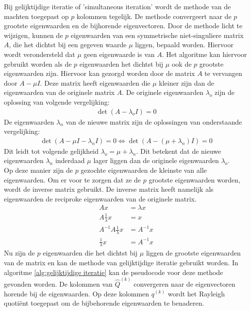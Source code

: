 \documentclass[a4paper, 12pt, titlepage, fleqn]{article}
\begin{document}
Bij gelijktijdige iteratie of 'simultaneous iteration' wordt de methode van de machten toegepast op $p$ kolommen tegelijk. De methode convergeert naar de $p$ grootste eigenwaarden en de bijhorende eigenvectoren. Door de methode licht te wijzigen, kunnen de $p$ eigenwaarden van een symmetrische niet-singuliere matrix $A$, die het dichtst bij een gegeven waarde $\mu$ liggen, bepaald worden. Hiervoor wordt verondersteld dat $\mu$ geen eigenwaarde is van $A$. Het algoritme kan hiervoor gebruikt worden als de $p$ eigenwaarden het dichtst bij $\mu$ ook de $p$ grootste eigenwaarden zijn. Hiervoor kan gezorgd worden door de matrix $A$ te vervangen door $A - \mu I$. Deze matrix heeft eigenwaarden die $\mu$ kleiner zijn dan de eigenwaarden van de originele matrix $A$. De originele eigenwaarden $\lambda_o$ zijn de oplossing van volgende vergelijking:
\begin{align*}
\det (A-\lambda_o I) = 0
\end{align*}
De eigenwaarden $\lambda_n$ van de nieuwe matrix zijn de oplossingen van onderstaande vergelijking:
\begin{align*}
\det (A - \mu I - \lambda_n I) = 0 \Leftrightarrow \det(A -(\mu + \lambda_n)I) = 0
\end{align*}
Dit leidt tot volgende gelijkheid $\lambda_o = \mu + \lambda_n$. Dit betekent dat de nieuwe eigenwaarden $\lambda_n$ inderdaad $\mu$ lager liggen dan de originele eigenwaarden $\lambda_o$.\\
Op deze manier zijn de $p$ gezochte eigenwaarden de kleinste van alle eigenwaarden. Om er voor te zorgen dat ze de $p$ grootste eigenwaarden worden, wordt de inverse matrix gebruikt. De inverse matrix heeft namelijk als eigenwaarden de reciproke eigenwaarden van de originele matrix.
\begin{align*}
Ax &= \lambda x\\
A\frac{1}{\lambda}x &= x\\
A^{-1}A\frac{1}{\lambda}x &= A^{-1}x\\
\frac{1}{\lambda}x &= A^{-1}x
\end{align*}
Nu zijn de $p$ eigenwaarden die het dichtst bij $\mu$ liggen de grootste eigenwaarden van de matrix en kan de methode van gelijktijdige iteratie gebruikt worden. In algoritme \ref{alg:gelijktijdige iteratie} kan de pseudocode voor deze methode gevonden worden. De kolommen van $\hat{Q}^{(k)}$ convergeren naar de eigenvectoren horende bij de eigenwaarden. Op deze kolommen $q^{(k)}$ wordt het Rayleigh quoti\"ent toegepast om de bijbehorende eigenwaarden te benaderen.
\end{document}
